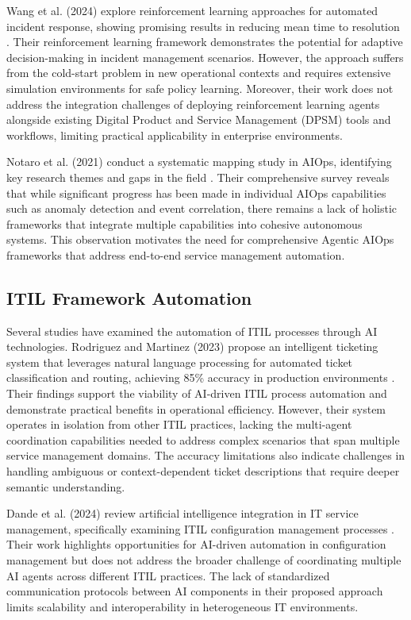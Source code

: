 \documentclass{article}
\begin{document}
Wang et al. (2024) explore reinforcement learning approaches for automated incident response, showing promising results in reducing mean time to resolution \cite{wang2024}. Their reinforcement learning framework demonstrates the potential for adaptive decision-making in incident management scenarios. However, the approach suffers from the cold-start problem in new operational contexts and requires extensive simulation environments for safe policy learning. Moreover, their work does not address the integration challenges of deploying reinforcement learning agents alongside existing Digital Product and Service Management (DPSM) tools and workflows, limiting practical applicability in enterprise environments.

Notaro et al. (2021) conduct a systematic mapping study in AIOps, identifying key research themes and gaps in the field \cite{notaro2021}. Their comprehensive survey reveals that while significant progress has been made in individual AIOps capabilities such as anomaly detection and event correlation, there remains a lack of holistic frameworks that integrate multiple capabilities into cohesive autonomous systems. This observation motivates the need for comprehensive Agentic AIOps frameworks that address end-to-end service management automation.

\subsection{ITIL Framework Automation}

Several studies have examined the automation of ITIL processes through AI technologies. Rodriguez and Martinez (2023) propose an intelligent ticketing system that leverages natural language processing for automated ticket classification and routing, achieving 85\% accuracy in production environments \cite{rodriguez2023}. Their findings support the viability of AI-driven ITIL process automation and demonstrate practical benefits in operational efficiency. However, their system operates in isolation from other ITIL practices, lacking the multi-agent coordination capabilities needed to address complex scenarios that span multiple service management domains. The accuracy limitations also indicate challenges in handling ambiguous or context-dependent ticket descriptions that require deeper semantic understanding.

Dande et al. (2024) review artificial intelligence integration in IT service management, specifically examining ITIL configuration management processes \cite{dande2024}. Their work highlights opportunities for AI-driven automation in configuration management but does not address the broader challenge of coordinating multiple AI agents across different ITIL practices. The lack of standardized communication protocols between AI components in their proposed approach limits scalability and interoperability in heterogeneous IT environments.
\end{document}
